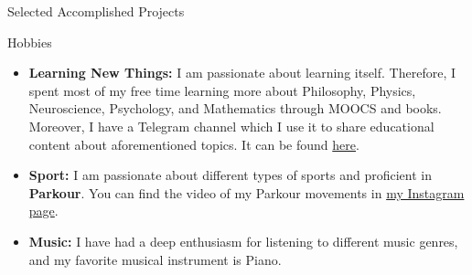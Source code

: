 \documentclass[]{mcdowellcv}
\begin{document}
\begin{cvsection}{Selected Accomplished Projects}
\begin{cvsubsection}{}{}{}
\begin{itemize}
 
        	\end{itemize}
	    \end{cvsubsection}

    \end{cvsection}
    
    
    \begin{cvsection}{Hobbies}
    	\begin{cvsubsection}{}{}{}
    	
    	\begin{itemize}
    	    \item \textbf{Learning New Things:} I am passionate about learning itself. Therefore, I spent most of my free time learning more about Philosophy, Physics, Neuroscience, Psychology, and Mathematics through MOOCS and books. Moreover, I have a Telegram channel which I use it to share educational content about aforementioned topics. It can be found \href{https://t.me/my_personal_expriences}{here}.
    	    \item \textbf{Sport:} I am passionate about different types of sports and proficient in \textbf{Parkour}. You can find the video of my Parkour movements in \href{https://www.instagram.com/erfan_mhi/}{my Instagram page}.
    	    \item \textbf{Music:} I have had a deep enthusiasm for listening to different music genres, and my favorite musical instrument is Piano.
	    \end{itemize}
	    
    	\end{cvsubsection}
    \end{cvsection}
	
\end{document}

